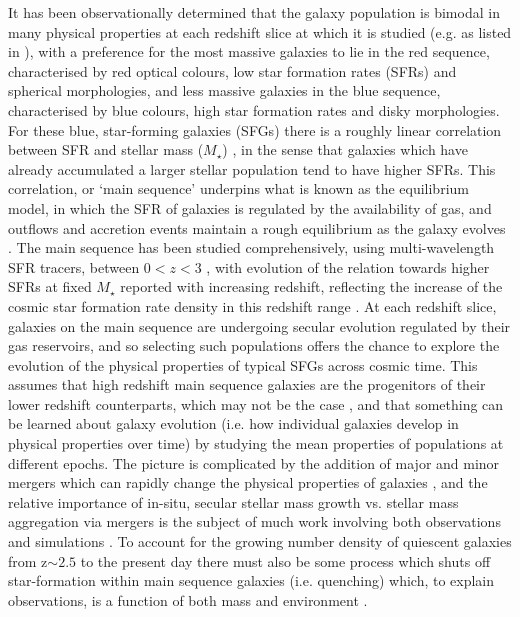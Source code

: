 \documentclass[a4paper,fleqn,usenatbib]{mn2e}
\begin{document}
It has been observationally determined that the galaxy population is bimodal in many physical properties at each redshift slice at which it is studied (e.g. as listed in \cite{Dekel2006}), with a preference for the most massive galaxies to lie in the red sequence, characterised by red optical colours, low star formation rates (SFRs) and spherical morphologies, and less massive galaxies in the blue sequence, characterised by blue colours, high star formation rates and disky morphologies. 
For these blue, star-forming galaxies (SFGs) there is a roughly linear correlation between SFR and stellar mass ($M_{\star}$) \citep[e.g.][]{Daddi2007,Noeske2007,Elbaz2007}, in the sense that galaxies which have already accumulated a larger stellar population tend to have higher SFRs.
This correlation, or `main sequence' underpins what is known as the equilibrium model, in which the SFR of galaxies is regulated by the availability of gas, and outflows and accretion events maintain a rough equilibrium as the galaxy evolves \citep[e.g.][]{Dave2012,Lilly2013,Saintonge2013}.
The main sequence has been studied comprehensively, using multi-wavelength SFR tracers, between $0 < z < 3$ \citep[e.g.][]{Rodighiero2011,Karim2011,Whitaker2012,Behroozi2013b,Whitaker2014,Rodighiero2014,Speagle2014,Pannella2014,Sparre2015,Lee2015,Nelson2016}, with evolution of the relation towards higher SFRs at fixed $M_{\star}$ reported with increasing redshift, reflecting the increase of the cosmic star formation rate density in this redshift range \citep{Madau_2014}.
At each redshift slice, galaxies on the main sequence are undergoing secular evolution regulated by their gas reservoirs, and so selecting such populations offers the chance to explore the evolution of the physical properties of typical SFGs across cosmic time.
This assumes that high redshift main sequence galaxies are the progenitors of their lower redshift counterparts, which may not be the case \citep[e.g.][]{Gladders2013,Kelson2014,Abramson2016b}, and that something can be learned about galaxy evolution (i.e. how individual galaxies develop in physical properties over time) by studying the mean properties of populations at different epochs.
The picture is complicated by the addition of major and minor mergers which can rapidly change the physical properties of galaxies \citep[e.g.][]{Toomre1977,Lotz2008,Conselice2011,Conselice2014}, and the relative importance of in-situ, secular stellar mass growth vs. stellar mass aggregation via mergers is the subject of much work involving both observations and simulations \citep[e.g.][]{Robaina2009,Kaviraj2012,Stott2013,Lofthouse2016,Qu2016}. 
To account for the growing number density of quiescent galaxies from z$\sim 2.5$ to the present day \citep[e.g.][]{Brammer2011} there must also be some process which shuts off star-formation within main sequence galaxies (i.e. quenching) which, to explain observations, is a function of both mass and environment \citep{Peng2010}.
\end{document}
